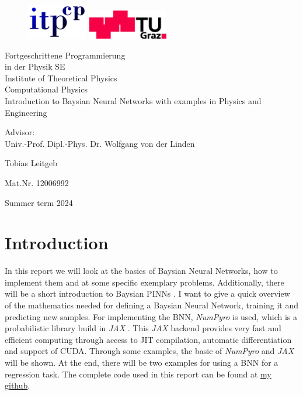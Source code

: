 \documentclass{article}
\newcommand{\bacc}{ Fortgeschrittene Programmierung \\ in der Physik SE}
\begin{document}
\begin{titlepage}
    \begin{figure}
    \includegraphics[width=3.cm]{logo-itp.png} \hfill
    \includegraphics[width=3.5cm]{logo-tu.png} \par
    \end{figure}
    
    \begin{center}
    {\huge\sc \bacc} \\ Institute of Theoretical Physics\\
    Computational Physics\\
    
    \vspace{5cm}
    {\huge\sc Introduction to Baysian Neural Networks with examples in Physics and Engineering} \par
    Advisor: \\ Univ.-Prof. Dipl.-Phys. Dr. Wolfgang von der Linden \\ 
    \vspace{5cm}
    
    {\Large\sc Tobias Leitgeb}
    
    {Mat.Nr. 12006992}
    
    \vspace{3cm}
    Summer term 2024
    \end{center}
    \end{titlepage}
\section{Introduction}

In this report we will look at the basics of Baysian Neural Networks, how to implement them and at some specific exemplary problems. Additionally, there will be a short introduction to Baysian PINNs \cite{Yang_2021}. I want to give a quick overview of the mathematics needed for defining a Baysian Neural Network, training it and predicting new samples. For implementing the BNN, \textit{NumPyro} \cite{bingham2019pyro, phan2019composable} is used, which is a probabilistic library build in \textit{JAX} \cite{jax2018github}. This \textit{JAX} backend provides very fast and efficient computing through access to JIT compilation, automatic differentiation and support of CUDA. Through some examples, the basic of \textit{NumPyro} and \textit{JAX} will be shown. At the end, there will be two examples for using a BNN for a regression task. The complete code used in this report can be found at \href{https://github.com/TobiLeitgeb/BNN_project}{my github}.
\end{document}
